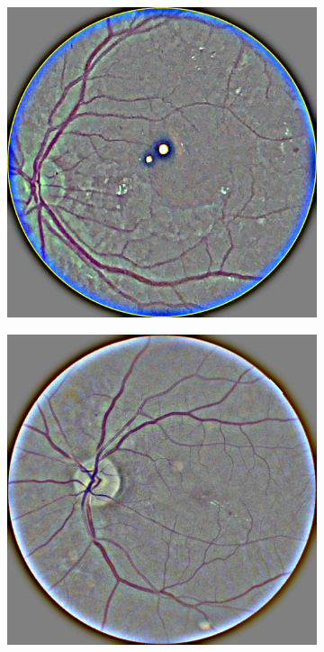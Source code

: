 \begin{figure}[!t]
\begin{subfigure}[t]{0.3\textwidth}
  \includegraphics[width=\textwidth]{img/samsung_proc.png}
\end{subfigure}
\begin{subfigure}[t]{0.3\textwidth}
  \includegraphics[width=\textwidth]{img/OCT_proc.jpg}

\end{subfigure}
\end{figure}
